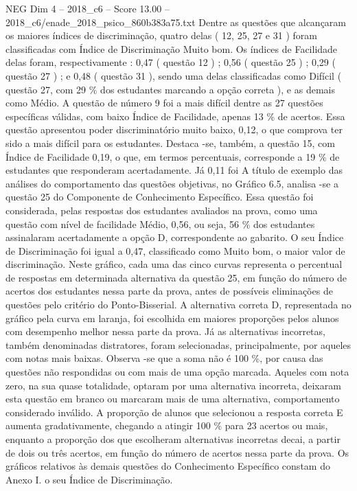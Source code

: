 \begin{textsample}{NEG Dim 4 – 2018\_c6 – Score 13.00 – 2018\_c6/enade\_2018\_psico\_860b383a75.txt}
Dentre as questões que alcançaram os maiores índices de discriminação, quatro delas ( 12, 25, 27 e 31 ) foram classificadas com Índice de Discriminação Muito bom.
Os índices de Facilidade delas foram, respectivamente : 0,47 ( questão 12 ) ; 0,56 ( questão 25 ) ; 0,29 ( questão 27 ) ; e 0,48 ( questão 31 ), sendo uma delas classificadas como Difícil ( questão 27, com 29 \% dos estudantes marcando a opção correta ), e as demais como Médio.
A questão de número 9 foi a mais difícil dentre as 27 questões específicas válidas, com baixo Índice de Facilidade, apenas 13 \% de acertos.
Essa questão apresentou poder discriminatório muito baixo, 0,12, o que comprova ter sido a mais difícil para os estudantes.
Destaca -se, também, a questão 15, com Índice de Facilidade 0,19, o que, em termos percentuais, corresponde a 19 \% de estudantes que responderam acertadamente.
Já 0,11 foi A título de exemplo das análises do comportamento das questões objetivas, no Gráfico 6.5, analisa -se a questão 25 do Componente de Conhecimento Específico.
Essa questão foi considerada, pelas respostas dos estudantes avaliados na prova, como uma questão com nível de facilidade Médio, 0,56, ou seja, 56 \% dos estudantes assinalaram acertadamente a opção D, correspondente ao gabarito.
O seu Índice de Discriminação foi igual a 0,47, classificado como Muito bom, o maior valor de discriminação.
Neste gráfico, cada uma das cinco curvas representa o percentual de respostas em determinada alternativa da questão 25, em função do número de acertos dos estudantes nessa parte da prova, antes de possíveis eliminações de questões pelo critério do Ponto-Bisserial.
A alternativa correta D, representada no gráfico pela curva em laranja, foi escolhida em maiores proporções pelos alunos com desempenho melhor nessa parte da prova.
Já as alternativas incorretas, também denominadas distratores, foram selecionadas, principalmente, por aqueles com notas mais baixas.
Observa -se que a soma não é 100 \%, por causa das questões não respondidas ou com mais de uma opção marcada.
Aqueles com nota zero, na sua quase totalidade, optaram por uma alternativa incorreta, deixaram esta questão em branco ou marcaram mais de uma alternativa, comportamento considerado inválido.
A proporção de alunos que selecionou a resposta correta E aumenta gradativamente, chegando a atingir 100 \% para 23 acertos ou mais, enquanto a proporção dos que escolheram alternativas incorretas decai, a partir de dois ou três acertos, em função do número de acertos nessa parte da prova.
Os gráficos relativos às demais questões do Conhecimento Específico constam do Anexo I. o seu Índice de Discriminação.

\end{textsample}
